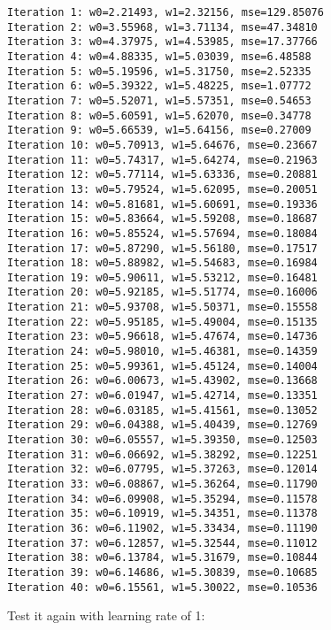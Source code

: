\documentclass[11pt]{article}
\begin{document}
    \begin{Verbatim}[commandchars=\\\{\}]
Iteration 1: w0=2.21493, w1=2.32156, mse=129.85076
Iteration 2: w0=3.55968, w1=3.71134, mse=47.34810
Iteration 3: w0=4.37975, w1=4.53985, mse=17.37766
Iteration 4: w0=4.88335, w1=5.03039, mse=6.48588
Iteration 5: w0=5.19596, w1=5.31750, mse=2.52335
Iteration 6: w0=5.39322, w1=5.48225, mse=1.07772
Iteration 7: w0=5.52071, w1=5.57351, mse=0.54653
Iteration 8: w0=5.60591, w1=5.62070, mse=0.34778
Iteration 9: w0=5.66539, w1=5.64156, mse=0.27009
Iteration 10: w0=5.70913, w1=5.64676, mse=0.23667
Iteration 11: w0=5.74317, w1=5.64274, mse=0.21963
Iteration 12: w0=5.77114, w1=5.63336, mse=0.20881
Iteration 13: w0=5.79524, w1=5.62095, mse=0.20051
Iteration 14: w0=5.81681, w1=5.60691, mse=0.19336
Iteration 15: w0=5.83664, w1=5.59208, mse=0.18687
Iteration 16: w0=5.85524, w1=5.57694, mse=0.18084
Iteration 17: w0=5.87290, w1=5.56180, mse=0.17517
Iteration 18: w0=5.88982, w1=5.54683, mse=0.16984
Iteration 19: w0=5.90611, w1=5.53212, mse=0.16481
Iteration 20: w0=5.92185, w1=5.51774, mse=0.16006
Iteration 21: w0=5.93708, w1=5.50371, mse=0.15558
Iteration 22: w0=5.95185, w1=5.49004, mse=0.15135
Iteration 23: w0=5.96618, w1=5.47674, mse=0.14736
Iteration 24: w0=5.98010, w1=5.46381, mse=0.14359
Iteration 25: w0=5.99361, w1=5.45124, mse=0.14004
Iteration 26: w0=6.00673, w1=5.43902, mse=0.13668
Iteration 27: w0=6.01947, w1=5.42714, mse=0.13351
Iteration 28: w0=6.03185, w1=5.41561, mse=0.13052
Iteration 29: w0=6.04388, w1=5.40439, mse=0.12769
Iteration 30: w0=6.05557, w1=5.39350, mse=0.12503
Iteration 31: w0=6.06692, w1=5.38292, mse=0.12251
Iteration 32: w0=6.07795, w1=5.37263, mse=0.12014
Iteration 33: w0=6.08867, w1=5.36264, mse=0.11790
Iteration 34: w0=6.09908, w1=5.35294, mse=0.11578
Iteration 35: w0=6.10919, w1=5.34351, mse=0.11378
Iteration 36: w0=6.11902, w1=5.33434, mse=0.11190
Iteration 37: w0=6.12857, w1=5.32544, mse=0.11012
Iteration 38: w0=6.13784, w1=5.31679, mse=0.10844
Iteration 39: w0=6.14686, w1=5.30839, mse=0.10685
Iteration 40: w0=6.15561, w1=5.30022, mse=0.10536
    \end{Verbatim}

    Test it again with learning rate of 1:
\end{document}
